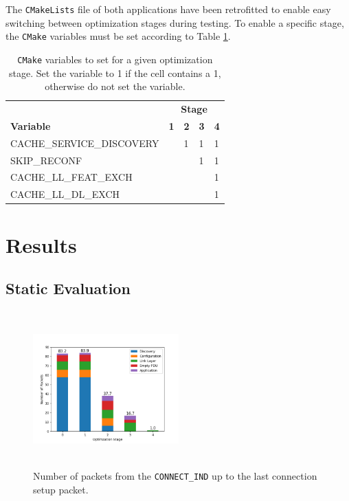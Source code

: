 The \texttt{CMakeLists} file of both applications have been retrofitted to enable easy switching between optimization stages during testing. To enable a specific stage, the \texttt{CMake} variables must be set according to Table \ref{tbl:stage_defs}.
\begin{table}
    \begin{center}
    \begin{tabular}{|l|l|l|l|l|}
        \hline
                                & \multicolumn{4}{c|}{\textbf{Stage}}   \\
        \textbf{Variable}    & \textbf{1} & \textbf{2} & \textbf{3} & \textbf{4} \\
        \hline
        CACHE\_SERVICE\_DISCOVERY &   & 1 & 1 & 1 \\
        \hline
        SKIP\_RECONF             &   &   & 1 & 1 \\
        \hline
        CACHE\_LL\_FEAT\_EXCH      &   &   &   & 1 \\
        \hline
        CACHE\_LL\_DL\_EXCH        &   &   &   & 1 \\
        \hline
    \end{tabular}
    \end{center}
    \caption{\texttt{CMake} variables to set for a given optimization stage. Set the variable to 1 if the cell contains a 1, otherwise do not set the variable.}
    \label{tbl:stage_defs}
\end{table}

\section{Results}
\label{sec:evaluation_results}

\subsection{Static Evaluation}
\label{sec:static_evaluation}
\begin{figure}[]
    \centering
    \includegraphics[width=0.5\textwidth,height=6cm,keepaspectratio=true]{plots/static_packet_division.png}
    \caption{
        Number of packets from the \texttt{CONNECT\_IND} up to the last connection setup packet.
    }
    \label{fig:static_packet_division}
\end{figure}

